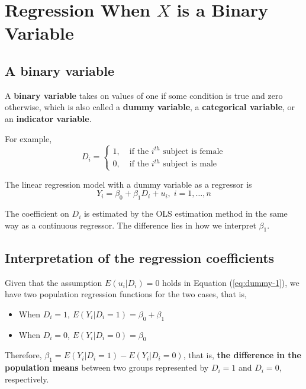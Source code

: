 \documentclass[a4paper,11pt]{article}
\begin{document}
\section{Regression When \(X\) is a Binary Variable}
\label{sec:orga655b19}

\subsection{A binary variable}
\label{sec:org1f51b33}

A \textbf{binary variable} takes on values of one if some condition is true
and zero otherwise, which is also called a \textbf{dummy variable}, a
\textbf{categorical variable}, or an \textbf{indicator variable}.

For example,
\begin{equation*}
D_i =
\begin{cases}
1,\; &\text{if the } i^{th} \text{ subject is female} \\
0,\; &\text{if the } i^{th} \text{ subject is male}
\end{cases}
\end{equation*}

The linear regression model with a dummy variable as a regressor is
\begin{equation}
\label{eq:dummy-1}
Y_i = \beta_0 + \beta_1 D_i + u_i,\; i = 1, \ldots, n
\end{equation}

The coefficient on \(D_i\) is estimated by the OLS estimation method
in the same way as a continuous regressor. The difference lies in how
we interpret \(\beta_1\).


\subsection{Interpretation of the regression coefficients}
\label{sec:orgd39ad1c}

Given that the assumption \(E(u_i | D_i) = 0\) holds in Equation
(\ref{eq:dummy-1}), we have two population regression functions for
the two cases, that is,
\begin{itemize}
\item When \(D_i = 1\), \(E(Y_i|D_i = 1) = \beta_0 + \beta_1\)
\item When \(D_i = 0\), \(E(Y_i|D_i = 0) = \beta_0\)
\end{itemize}

Therefore, \(\beta_1 = E(Y_i | D_i = 1) - E(Y_i |D_i = 0)\), that is,
\textbf{the difference in the population means} between two groups represented by
\(D_i = 1\) and \(D_i = 0\), respectively.
\end{document}

